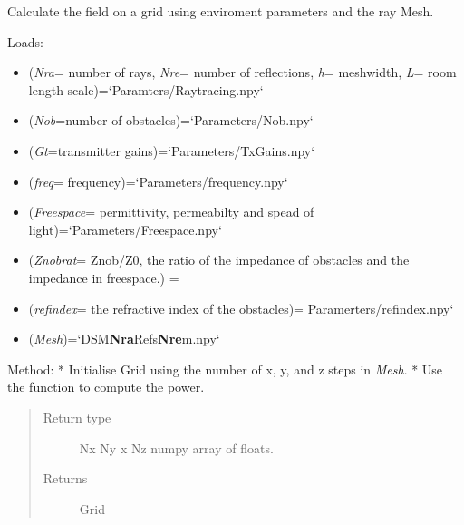 \documentclass[letterpaper,10pt,english]{sphinxmanual}
\begin{document}

\begin{fulllineitems}
\label{index:RayTracerMainProgram.power_grid}
Calculate the field on a grid using enviroment parameters and the   ray Mesh.

Loads:
\begin{itemize}
\item {} 
(\emph{Nra}= number of rays, \emph{Nre}= number of reflections,   \emph{h}= meshwidth, \emph{L}= room length scale)={}`Paramters/Raytracing.npy{}`

\item {} 
(\emph{Nob}=number of obstacles)={}`Parameters/Nob.npy{}`

\item {} 
(\emph{Gt}=transmitter gains)={}`Parameters/TxGains.npy{}`

\item {} 
(\emph{freq}= frequency)={}`Parameters/frequency.npy{}`

\item {} 
(\emph{Freespace}= permittivity, permeabilty   and spead of light)={}`Parameters/Freespace.npy{}`

\item {} 
(\emph{Znobrat}= Znob/Z0, the ratio of the impedance of obstacles and   the impedance in freespace.) = 

\item {} 
(\emph{refindex}= the refractive index of the obstacles)=  Paramerters/refindex.npy{}`

\item {} 
(\emph{Mesh})={}`DSM\textbf{Nra}Refs\textbf{Nre}m.npy{}`

\end{itemize}

Method:
* Initialise Grid using the number of x, y, and z steps in \emph{Mesh}.
* Use the function 
to compute the power.
\begin{quote}\begin{description}
\item[{Return type}] \leavevmode
Nx Ny x Nz numpy array of floats.

\item[{Returns}] \leavevmode
Grid

\end{description}\end{quote}

\end{fulllineitems}
\end{document}
